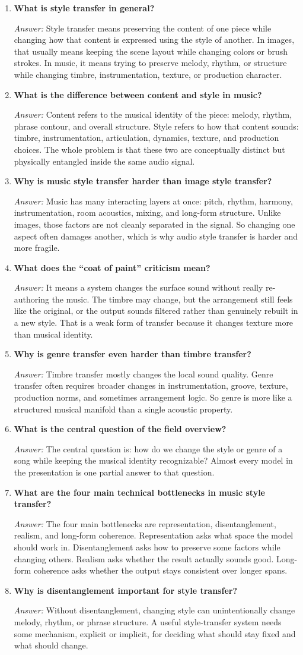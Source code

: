 \documentclass[11pt]{article}
\newcommand{\qa}[2]{
\item \textbf{#1}

\textit{Answer:} #2
}
\begin{document}
\begin{enumerate}
\qa{What is style transfer in general?}{
Style transfer means preserving the content of one piece while changing how that content is expressed using the style of another. In images, that usually means keeping the scene layout while changing colors or brush strokes. In music, it means trying to preserve melody, rhythm, or structure while changing timbre, instrumentation, texture, or production character.
}

\qa{What is the difference between content and style in music?}{
Content refers to the musical identity of the piece: melody, rhythm, phrase contour, and overall structure. Style refers to how that content sounds: timbre, instrumentation, articulation, dynamics, texture, and production choices. The whole problem is that these two are conceptually distinct but physically entangled inside the same audio signal.
}

\qa{Why is music style transfer harder than image style transfer?}{
Music has many interacting layers at once: pitch, rhythm, harmony, instrumentation, room acoustics, mixing, and long-form structure. Unlike images, those factors are not cleanly separated in the signal. So changing one aspect often damages another, which is why audio style transfer is harder and more fragile.
}

\qa{What does the ``coat of paint'' criticism mean?}{
It means a system changes the surface sound without really re-authoring the music. The timbre may change, but the arrangement still feels like the original, or the output sounds filtered rather than genuinely rebuilt in a new style. That is a weak form of transfer because it changes texture more than musical identity.
}

\qa{Why is genre transfer even harder than timbre transfer?}{
Timbre transfer mostly changes the local sound quality. Genre transfer often requires broader changes in instrumentation, groove, texture, production norms, and sometimes arrangement logic. So genre is more like a structured musical manifold than a single acoustic property.
}

\qa{What is the central question of the field overview?}{
The central question is: how do we change the style or genre of a song while keeping the musical identity recognizable? Almost every model in the presentation is one partial answer to that question.
}

\qa{What are the four main technical bottlenecks in music style transfer?}{
The four main bottlenecks are representation, disentanglement, realism, and long-form coherence. Representation asks what space the model should work in. Disentanglement asks how to preserve some factors while changing others. Realism asks whether the result actually sounds good. Long-form coherence asks whether the output stays consistent over longer spans.
}

\qa{Why is disentanglement important for style transfer?}{
Without disentanglement, changing style can unintentionally change melody, rhythm, or phrase structure. A useful style-transfer system needs some mechanism, explicit or implicit, for deciding what should stay fixed and what should change.
}
\end{enumerate}
\end{document}
